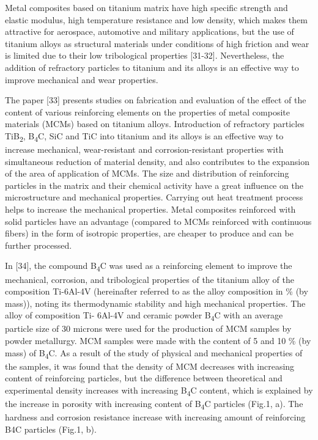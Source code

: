 \begin{multicols}{2}
Metal composites based on titanium matrix have high specific strength
and elastic modulus, high temperature resistance and low density, which
makes them attractive for aerospace, automotive and military
applications, but the use of titanium alloys as structural materials
under conditions of high friction and wear is limited due to their low
tribological properties {[}31-32{]}. Nevertheless, the addition of
refractory particles to titanium and its alloys is an effective way to
improve mechanical and wear properties.

The paper {[}33{]} presents studies on fabrication and evaluation of the
effect of the content of various reinforcing elements on the properties
of metal composite materials (MCMs) based on titanium alloys.
Introduction of refractory particles TiB\textsubscript{2},
B\textsubscript{4}C, SiC and TiC into titanium and its alloys is an
effective way to increase mechanical, wear-resistant and
corrosion-resistant properties with simultaneous reduction of material
density, and also contributes to the expansion of the area of
application of MCMs. The size and distribution of reinforcing particles
in the matrix and their chemical activity have a great influence on the
microstructure and mechanical properties. Carrying out heat treatment
process helps to increase the mechanical properties. Metal composites
reinforced with solid particles have an advantage (compared to MCMs
reinforced with continuous fibers) in the form of isotropic properties,
are cheaper to produce and can be further processed.

In {[}34{]}, the compound B\textsubscript{4}C was used as a reinforcing
element to improve the mechanical, corrosion, and tribological
properties of the titanium alloy of the composition Ti-6Al-4V
(hereinafter referred to as the alloy composition in \% (by mass)),
noting its thermodynamic stability and high mechanical properties. The
alloy of composition Ti- 6Al-4V and ceramic powder B\textsubscript{4}C
with an average particle size of 30 microns were used for the production
of MCM samples by powder metallurgy. MCM samples were made with the
content of 5 and 10 \% (by mass) of B\textsubscript{4}C. As a result of
the study of physical and mechanical properties of the samples, it was
found that the density of MCM decreases with increasing content of
reinforcing particles, but the difference between theoretical and
experimental density increases with increasing B\textsubscript{4}C
content, which is explained by the increase in porosity with increasing
content of B\textsubscript{4}C particles (Fig.1, a). The hardness and
corrosion resistance increase with increasing amount of reinforcing B4C
particles (Fig.1, b).
\end{multicols}

